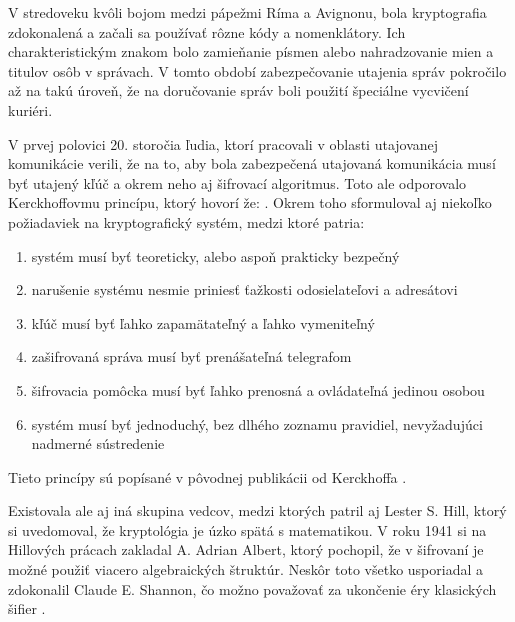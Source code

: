 V stredoveku kvôli bojom medzi pápežmi Ríma a Avignonu, bola kryptografia zdokonalená a začali sa používať rôzne kódy a nomenklátory.
Ich charakteristickým znakom bolo zamieňanie písmen alebo nahradzovanie mien a titulov osôb v správach.
V tomto období zabezpečovanie utajenia správ pokročilo až na takú úroveň, že na doručovanie správ boli použití špeciálne vycvičení kuriéri.

V prvej polovici 20. storočia ľudia, ktorí pracovali v oblasti utajovanej komunikácie verili, že na to, aby bola zabezpečená utajovaná komunikácia musí byť utajený kľúč a okrem neho aj šifrovací algoritmus. Toto ale odporovalo Kerckhoffovmu princípu, ktorý hovorí že: . Okrem toho sformuloval aj niekoľko požiadaviek na kryptografický systém, medzi ktoré patria:
\begin{enumerate}
\item systém musí byť teoreticky, alebo aspoň prakticky bezpečný
\item narušenie systému nesmie priniesť ťažkosti odosielateľovi a adresátovi
\item kľúč musí byť ľahko zapamätateľný a ľahko vymeniteľný
\item zašifrovaná správa musí byť prenášateľná telegrafom
\item šifrovacia pomôcka musí byť ľahko prenosná a ovládateľná jedinou osobou
\item systém musí byť jednoduchý, bez dlhého zoznamu pravidiel, nevyžadujúci nadmerné sústredenie
\end{enumerate}
Tieto princípy sú popísané v pôvodnej publikácii od Kerckhoffa \cite{kerckhoff}.

Existovala ale aj iná skupina vedcov, medzi ktorých patril aj Lester S. Hill, ktorý si uvedomoval, že kryptológia je úzko spätá s matematikou.
V roku 1941 si na Hillových prácach zakladal A. Adrian Albert, ktorý pochopil, že v šifrovaní je možné použiť viacero algebraických štruktúr.
Neskôr toto všetko usporiadal a zdokonalil Claude E. Shannon, čo možno považovať za ukončenie éry klasických šifier \cite{ks}.



